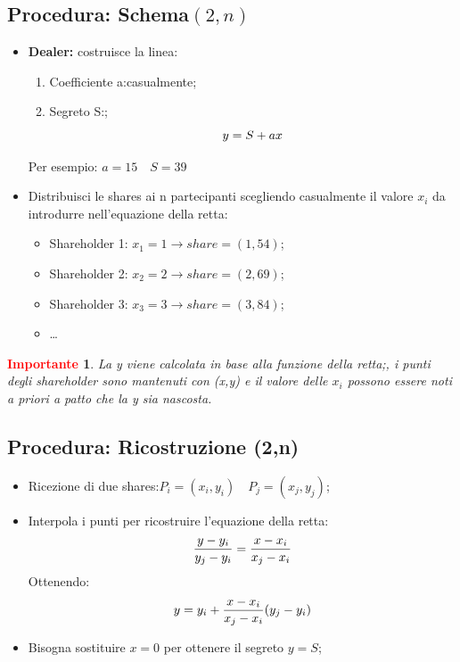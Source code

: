 \documentclass{book}
\newtheorem*{Importante}{\textbf{\textcolor{red}{Importante}}}
\begin{document}
\subsection{Procedura: Schema\((2,n)\)}
\begin{itemize}
	\item \textbf{Dealer:} costruisce la linea:
	      \begin{enumerate}
		      \item Coefficiente a:\@scelto casualmente;
		      \item Segreto S:\@noto;
		            \begin{equation*}
			            \centering
			            y=S+ax
		            \end{equation*}
	      \end{enumerate}
	      Per esempio: \(a=15\quad S=39\)
	\item Distribuisci le shares ai n partecipanti scegliendo casualmente il valore \(x_{i}\) da introdurre nell'equazione della retta:
	      \begin{itemize}
		      \item Shareholder 1: \(x_{1}=1\rightarrow share=(1,54)\);
		      \item Shareholder 2: \(x_{2}=2\rightarrow share=(2,69)\);
		      \item Shareholder 3: \(x_{3}=3\rightarrow share=(3,84)\);
		      \item \dots
	      \end{itemize}
\end{itemize}
\begin{Importante}
	La y viene calcolata in base alla funzione della retta;\@tuttavia, i punti degli shareholder sono mantenuti con (x,y) e il valore delle \(x_{i}\) possono essere noti a priori a patto che la y sia nascosta\@.
\end{Importante}
\subsection{Procedura: Ricostruzione (2,n)}
\begin{itemize}
	\item Ricezione di due shares:\(P_{i}=(x_{i},y_{i})\quad P_{j}=(x_{j},y_{j})\);
	\item Interpola i punti per ricostruire l'equazione della retta:
	      \begin{equation*}
		      \centering
		      \frac{y-y_{i}}{y_{j}-y_{i}}=\frac{x-x_{i}}{x_{j}-x_{i}}
	      \end{equation*}
	      Ottenendo:
	      \begin{equation*}
		      \centering
		      y=y_{i}+\frac{x-x_{i}}{x_{j}-x_{i}}(y_{j}-y_{i})
	      \end{equation*}
	\item Bisogna sostituire \(x=0\) per ottenere il segreto \(y=S\);
\end{itemize}
\end{document}

